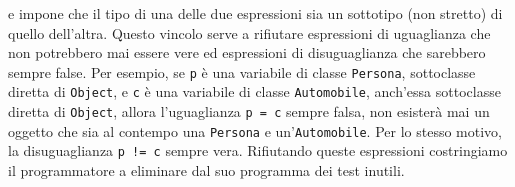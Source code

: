 \begin{description}
  e impone che il tipo di una delle due espressioni
  sia un sottotipo (non stretto) di quello dell'altra.
  Questo vincolo serve a rifiutare espressioni di uguaglianza
  che non potrebbero mai essere vere ed espressioni di disuguaglianza che
  sarebbero sempre false. Per esempio, se \texttt{p} \`e una variabile di
  classe \texttt{Persona}, sottoclasse diretta di \texttt{Object}, e
  \texttt{c} \`e una variabile di classe
  \texttt{Automobile}, anch'essa sottoclasse diretta di
  \texttt{Object}, allora l'uguaglianza \texttt{p = c} \e sempre falsa,
  \poiche non esister\`a mai un oggetto che sia al contempo
  una \texttt{Persona} e un'\texttt{Automobile}. Per lo stesso motivo,
  la disuguaglianza \texttt{p != c} \e sempre vera. Rifiutando queste
  espressioni costringiamo il programmatore a eliminare dal suo programma
  dei test inutili.
\end{description}
%
